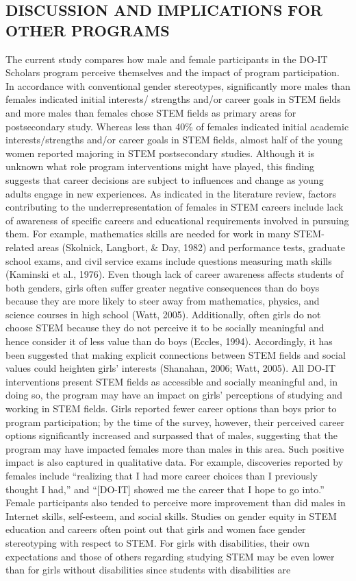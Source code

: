 \documentclass[11.5pt]{sig-alternate} %
\begin{document}
\begin{large}
\section*{DISCUSSION AND IMPLICATIONS FOR OTHER PROGRAMS }
 
The current study compares how male and female participants in the DO-IT Scholars program perceive themselves and the impact of program participation. In accordance with conventional gender stereotypes, significantly more males than females indicated initial interests/ strengths and/or career goals in STEM fields and more males than females chose STEM fields as primary areas for postsecondary study. Where\-as less than 40\% of females indicated initial academic interests/strengths and/or career goals in STEM fields, almost half of the young women reported majoring in STEM postsecondary studies. Although it is unknown what role program interventions might have played, this finding suggests that career decisions are subject to influences and change as young adults engage in new experiences. As indicated in the literature review, factors contributing to the underrepresentation of females in STEM careers include lack of awareness of specific careers and educational requirements involved in pursuing them. For example, mathematics skills are needed for work in many STEM-related areas (Skolnick, Langbort, \& Day, 1982) and performance tests, graduate school exams, and civil service exams include questions measuring math skills (Kaminski et al., 1976). Even though lack of career awareness affects students of both genders, girls often suffer greater negative consequences than do boys because they are more likely to steer away from mathematics, physics, and science courses in high school (Watt, 2005). Additionally, often girls do not choose STEM because they do not perceive it to be socially meaningful and hence consider it of less value than do boys (Eccles, 1994). Accordingly, it has been suggested that making explicit connections between STEM fields and social values could heighten girls’ interests (Shanahan, 2006; Watt, 2005). All DO-IT interventions present STEM fields as accessible and socially meaningful and, in doing so, the program may have an impact on girls’ perceptions of studying and working in STEM fields.  Girls reported fewer career options than boys prior to program participation; by the time of the survey, however, their perceived career options significantly increased and surpassed that of males, suggesting that the program may have impacted females more than males in this area. Such positive impact is also captured in qualitative data. For example, discoveries reported by females include “realizing that I had more career choices than I previously thought I had,” and “[DO-IT] showed me the career that I hope to go into.” Female participants also tended to perceive more improvement than did males in Internet skills, self-esteem, and social skills. Studies on gender equity in STEM education and careers often point out that girls and women face gender stereotyping with respect to STEM. For girls with disabilities, their own expectations and those of others regarding studying STEM may be even lower than for girls without disabilities since students with disabilities are 
\end{large}
\end{document}

